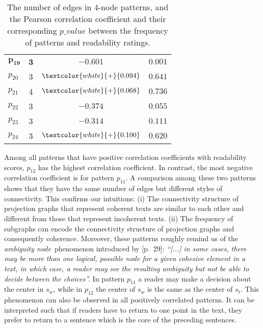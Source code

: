 \begin{table}[!ht]
\begin{center}
\begin{tabular}{lccc}
			$\mathbf{p_{19}}$	& \textbf{3} 	  & $\mathbf{-0.601}$ 				& $\mathbf{0.001}$			\\
			$p_{20}$			& 3 			  & $\textcolor{white}{+}{0.094}$   & $0.641$					\\
			$p_{21}$			& 4 			  & $\textcolor{white}{+}{0.068}$	& $0.736$				    \\
			$p_{22}$			& 3				  & $-0.374$ 						& $0.055$					\\
			$p_{23}$			& 3				  & $-0.314$ 						& $0.111$					\\
			$p_{24}$ 			& 3				  & $\textcolor{white}{+}{0.100}$   & $0.620$					\\
			\bottomrule
		\end{tabular}
	\end{center}
	\caption{The number of edges in 4-node patterns, and the Pearson correlation coefficient and their corresponding $p\_value$ between the frequency of patterns and readability ratings.} 
	\label{tab:correlation-4node}
\end{table}

Among all patterns that have positive correlation coefficients with readability scores, $p_{12}$ has the highest correlation coefficient. 
In contrast, the most negative correlation coefficient is for pattern $p_{11}$. 
A comparison among these two patterns shows that they have the same number of edges but different styles of connectivity.
This confirms our intuitions: (i) The connectivity structure of projection graphs that represent coherent texts are similar to each other and different from those that represent incoherent texts. 
(ii) The frequency of subgraphs can encode the connectivity structure of projection graphs and consequently coherence. 
Moreover, these patterns roughly remind us of the \emph{ambiguity node}\ phenomenon introduced by  [p.\ 29]: 
\emph{
	``[...] in some cases, there may be more
	than one logical, possible node for a given cohesive element in a text, in which case, a reader may see the resulting ambiguity but not be able to decide between the choices''.
	}
In pattern $p_{11}$ a reader may make a decision about the center in $s_w$, while in $p_{12}$ the center of $s_w$ is the same as the center of $s_t$. 
This phenomenon can also be observed in all positively correlated patterns.  
It can be interpreted such that if readers have to return to one point in the text, they prefer to return to a sentence which is the core of the preceding sentences.

